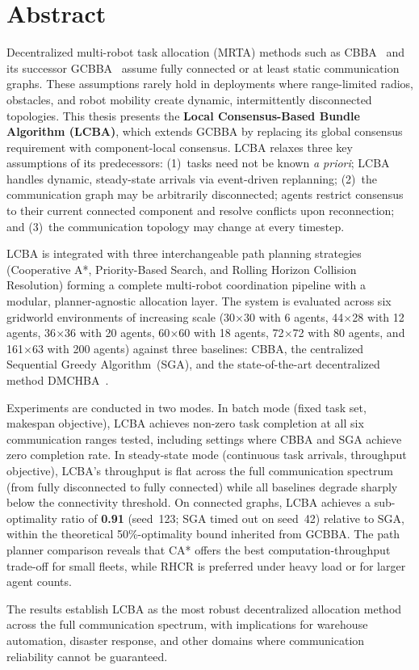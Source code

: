 \chapter*{Abstract}

Decentralized multi-robot task allocation (MRTA) methods such as
CBBA~\cite{choi2009consensus} and its successor
GCBBA~\cite{kha2025enhancing} assume fully connected or at least static
communication graphs.
These assumptions rarely hold in deployments where range-limited radios,
obstacles, and robot mobility create dynamic, intermittently disconnected
topologies.
This thesis presents the \textbf{Local Consensus-Based Bundle Algorithm (LCBA)},
which extends GCBBA by replacing its global consensus requirement with
component-local consensus.
LCBA relaxes three key assumptions of its predecessors:
(1)~tasks need not be known \emph{a priori}; LCBA handles dynamic,
steady-state arrivals via event-driven replanning;
(2)~the communication graph may be arbitrarily disconnected; agents restrict
consensus to their current connected component and resolve conflicts upon
reconnection; and
(3)~the communication topology may change at every timestep.

LCBA is integrated with three interchangeable path planning strategies
(Cooperative A*, Priority-Based Search, and Rolling Horizon Collision
Resolution) forming a complete multi-robot coordination pipeline with a
modular, planner-agnostic allocation layer.
The system is evaluated across six gridworld environments of increasing scale
(30$\times$30 with 6 agents, 44$\times$28 with 12 agents, 36$\times$36 with
20 agents, 60$\times$60 with 18 agents, 72$\times$72 with 80 agents, and
161$\times$63 with 200 agents) against three baselines: CBBA, the centralized
Sequential Greedy Algorithm~(SGA), and the state-of-the-art decentralized
method DMCHBA~\cite{samiei2024dmchba}.

Experiments are conducted in two modes.
In batch mode (fixed task set, makespan objective), LCBA achieves
non-zero task completion at all six communication ranges tested, including
settings where CBBA and SGA achieve zero completion rate.
In steady-state mode (continuous task arrivals, throughput objective),
LCBA's throughput is flat across the full communication spectrum
(from fully disconnected to fully connected) while all baselines degrade
sharply below the connectivity threshold.
On connected graphs, LCBA achieves a sub-optimality ratio of
\textbf{0.91} (seed~123; SGA timed out on seed~42) relative to SGA, within the
theoretical 50\%-optimality bound inherited from GCBBA.
The path planner comparison reveals that CA* offers the best
computation-throughput trade-off for small fleets, while RHCR is preferred
under heavy load or for larger agent counts.

The results establish LCBA as the most robust decentralized allocation
method across the full communication spectrum, with implications for
warehouse automation, disaster response, and other domains where
communication reliability cannot be guaranteed.
